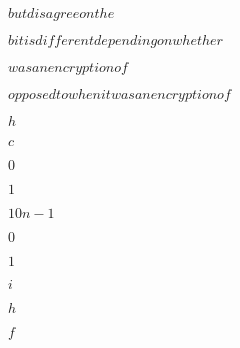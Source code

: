 \documentclass[10pt]{book}
\begin{document}
\begin{mdSnippets}
\begin{mdInlineSnippet}[afdbe8b16ac3e175cf50d527032dd8ae]%
$ but disagree on the $\end{mdInlineSnippet}%
\begin{mdInlineSnippet}[698e73bb40a7b029f34625856309e297]%
$ bit is different depending on whether  $\end{mdInlineSnippet}%
\begin{mdInlineSnippet}%
$ was an encryption of $\end{mdInlineSnippet}%
\begin{mdInlineSnippet}[77be21661088d2e72f1b55c273ec4760]%
$ opposed to when it was an encryption of $\end{mdInlineSnippet}%
\begin{mdInlineSnippet}[2510c39011c5be704182423e3a695e91]%
$h$\end{mdInlineSnippet}%
\begin{mdInlineSnippet}[4a8a08f09d37b73795649038408b5f33]%
$c$\end{mdInlineSnippet}%
\begin{mdInlineSnippet}%
$0$\end{mdInlineSnippet}%
\begin{mdInlineSnippet}[c4ca4238a0b923820dcc509a6f75849b]%
$1$\end{mdInlineSnippet}%
\begin{mdInlineSnippet}[8bf447e436a761b9f5f484ee1800cf17]%
$10n -1$\end{mdInlineSnippet}%
\begin{mdInlineSnippet}%
$0$\end{mdInlineSnippet}%
\begin{mdInlineSnippet}[c4ca4238a0b923820dcc509a6f75849b]%
$1$\end{mdInlineSnippet}%
\begin{mdInlineSnippet}[865c0c0b4ab0e063e5caa3387c1a8741]%
$i$\end{mdInlineSnippet}%
\begin{mdInlineSnippet}[2510c39011c5be704182423e3a695e91]%
$h$\end{mdInlineSnippet}%
\begin{mdInlineSnippet}%
$f$\end{mdInlineSnippet}%
\begin{mdInlineSnippet}%

\end{mdInlineSnippet}
\end{mdSnippets}
\end{document}

